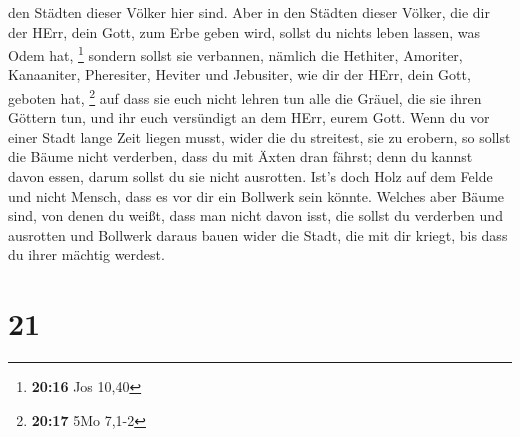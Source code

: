 den Städten dieser Völker hier sind.  Aber in den Städten
dieser Völker, die dir der HErr, dein Gott, zum Erbe geben wird, sollst
du nichts leben lassen, was Odem hat, \footnote{\textbf{20:16} Jos 10,40}
 sondern sollst sie verbannen, nämlich die Hethiter,
Amoriter, Kanaaniter, Pheresiter, Heviter und Jebusiter, wie dir der
HErr, dein Gott, geboten hat, \footnote{\textbf{20:17} 5Mo 7,1-2}
 auf dass sie euch nicht lehren tun alle die Gräuel, die
sie ihren Göttern tun, und ihr euch versündigt an dem HErr, eurem Gott.
 Wenn du vor einer Stadt lange Zeit liegen musst, wider
die du streitest, sie zu erobern, so sollst die Bäume nicht verderben,
dass du mit Äxten dran fährst; denn du kannst davon essen, darum sollst
du sie nicht ausrotten. Ist's doch Holz auf dem Felde und nicht Mensch,
dass es vor dir ein Bollwerk sein könnte.  Welches aber
Bäume sind, von denen du weißt, dass man nicht davon isst, die sollst du
verderben und ausrotten und Bollwerk daraus bauen wider die Stadt, die
mit dir kriegt, bis dass du ihrer mächtig werdest.

\hypertarget{section-20}{%
\section{21}\label{section-20}}

